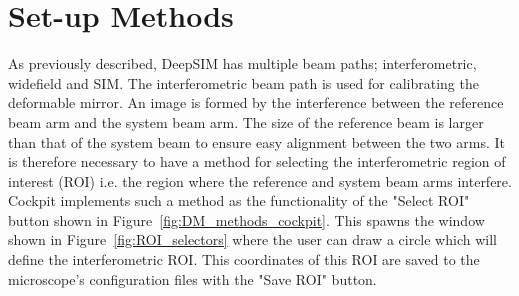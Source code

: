 \section{Set-up Methods}
\label{sec:set_up_methods}

As previously described, DeepSIM has multiple beam paths; interferometric, widefield and SIM. The interferometric beam path is used for calibrating the deformable mirror. An image is formed by the interference between the reference beam arm and the system beam arm. The size of the reference beam is larger than that of the system beam to ensure easy alignment between the two arms. It is therefore necessary to have a method for selecting the interferometric region of interest (ROI) i.e. the region where the reference and system beam arms interfere. Cockpit implements such a method as the functionality of the "Select ROI" button shown in Figure~\ref{fig:DM_methods_cockpit}. This spawns the window shown in Figure~\ref{fig:ROI_selectors} where the user can draw a circle which will define the interferometric ROI. This coordinates of this ROI are saved to the microscope's configuration files with the "Save ROI" button.

